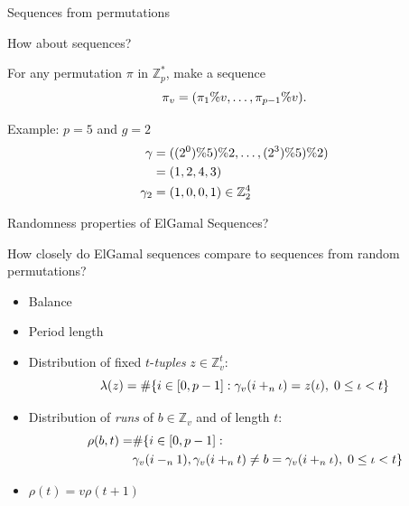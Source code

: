 \begin{frame}{Sequences from permutations}
    \begin{center}
        {\Large
            How about sequences?
        }
    \end{center}
    
    \pause
    For any  permutation $\pi$ in $\mathbb{Z}_p^*$, make a sequence
    \[
        \pi_v = (\pi_1 \% v, \ldots, \pi_{p-1}\% v).
    \]
    
    \pause

    Example:  $p=5$ and $g=2$
    \begin{align*}            \gamma &= ( (2^0) \% 5) \% 2, \ldots, (2^3) \% 5) \% 2)\\
      &= (1, 2, 4, 3) \\
        \gamma_2 &= (1, 0, 0, 1) \in \mathbb{Z}_2^4
    \end{align*}
\end{frame}


\begin{frame}{Randomness properties of ElGamal Sequences?}
    
    \begin{center}
        How closely do ElGamal sequences compare to sequences from random permutations?
    \end{center}
    
    \begin{itemize}
        \item Balance
        \item Period length
        \item Distribution of fixed $t$-\emph{tuples} $z\in\mathbb{Z}_v^t$:
        $$\lambda(z) = \#{\{i \in [0,p-1]: \gamma_v(i+_{n} \iota) = z(\iota),\; 0 \leq \iota < t\}}$$
        \item  Distribution of \emph{runs} of $b\in\mathbb{Z}_v$ and of length $t$:
        \begin{align*}
            \rho(b,t) = & \#{ \{i \in [0,p-1]: }\\
                        &\gamma_v(i-_{n} 1),\gamma_v(i+_n t) \neq b = \gamma_v(i+_n\iota),\; 0 \leq \iota < t\}
        \end{align*}
        \item $\rho(t) = v \rho(t+1)$
    \end{itemize}
  
  \end{frame}

